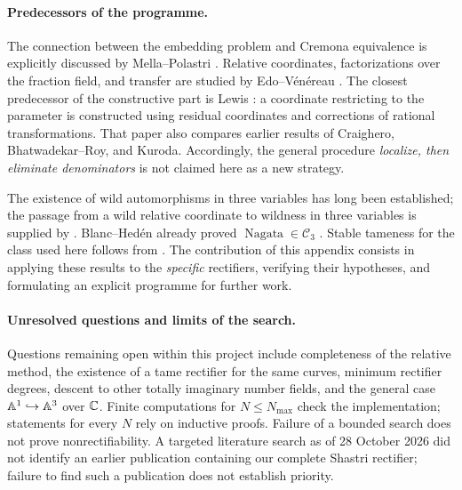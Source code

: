 \paragraph{Predecessors of the programme.}
The connection between the embedding problem and Cremona equivalence
is explicitly discussed by Mella--Polastri
\cite[introduction and Theorem~1]{MP2009}.
Relative coordinates, factorizations over the fraction field, and
transfer are studied by Edo--V\'en\'ereau \cite{EV2001}.
The closest predecessor of the constructive part is Lewis
\cite[Lemma~1, Theorems~2 and~12]{Lewis2024}: a coordinate restricting
to the parameter is constructed using residual coordinates and
corrections of rational transformations. That paper also compares
earlier results of Craighero, Bhatwadekar--Roy, and Kuroda.
Accordingly, the general procedure \emph{localize, then eliminate
denominators} is not claimed here as a new strategy.

The existence of wild automorphisms in three variables has long been
established; the passage from a wild relative coordinate to wildness
in three variables is supplied by \cite{UY2004}. Blanc--Hed\'en
already proved $\operatorname{Nagata}\in\mathcal C_3$
\cite[Proposition~6.8]{BH2015}. Stable tameness for the class used
here follows from \cite[Corollary~4.9]{BEW2012}.
The contribution of this appendix consists in applying these results
to the \emph{specific} rectifiers, verifying their hypotheses, and
formulating an explicit programme for further work.

\paragraph{Unresolved questions and limits of the search.}
Questions remaining open within this project include completeness
of the relative method, the existence of a tame rectifier for the
same curves, minimum rectifier degrees, descent to other totally
imaginary number fields, and the general case
${\mathbb A}^1\hookrightarrow{\mathbb A}^3$ over ${\mathbb C}$.
Finite computations for $N\leq N_{\max}$ check the implementation;
statements for every $N$ rely on inductive proofs.
Failure of a bounded search does not prove nonrectifiability.
A targeted literature search as of 28 October 2026 did not identify
an earlier publication containing our complete Shastri rectifier;
failure to find such a publication does not establish priority.

